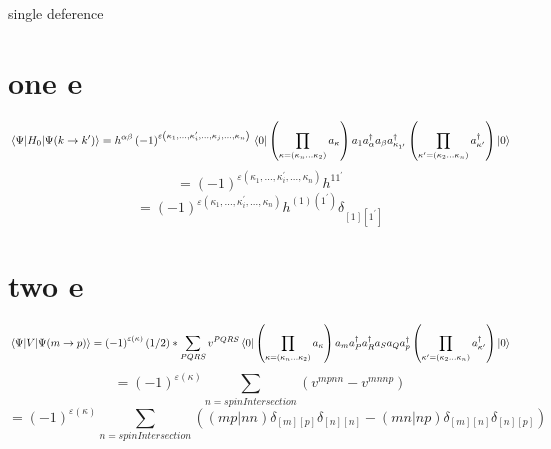 \documentclass{article}
\begin{document}
single deference
\section{one e}
\begin{equation}
    \mel{\Psi }{H_{0}}{\Psi (k\rightarrow k^{\prime})}=h^{\alpha\beta}\left(-1\right)^{\varepsilon\left(\kappa_{1},\dots,\kappa_{i}^{\prime},\dots,\kappa _{j},...,\kappa_{n}\right)}\\
    \bra{0}\left(\prod_{\kappa=\left(\kappa_{n}\dots\kappa_{2}\right)}a_{\kappa}\right)
        a_{1}a^{\dag}_{\alpha  }a_{\beta }a^{\dag}_{\kappa _{1^{\prime}}}
    \left(\prod_{\kappa^{\prime}=\left(\kappa_{2}\dots\kappa_{n}\right)}a^{\dag}_{\kappa^{\prime}}\right)\ket{0}
\end{equation}
\begin{equation}
    =\left(-1\right)^{\varepsilon\left(\kappa_{1},\dots,\kappa_{i}^{\prime},\dots,\kappa_{n}\right)}h^{11^{\prime}}
\end{equation}
\begin{equation}
    =\left(-1\right)^{\varepsilon\left(\kappa_{1},\dots,\kappa_{i}^{\prime},\dots,\kappa_{n}\right)}h^{(1)(1^{\prime})}\delta _{[1][1^{\prime}]}
\end{equation}
\section{two e}
\begin{equation}
    \mel{\Psi }{V}{\Psi (m\rightarrow p)}=\left(-1\right)^{\varepsilon\left(\kappa\right)}(1/2)*\sum_{PQRS} v^{PQRS }\\
    \bra{0}\left(\prod_{\kappa=\left(\kappa_{n}\dots\kappa_{2}\right)}a_{\kappa}\right)
        a_{m}a^{\dag}_{P }a^{\dag}_{R }a_{S }a_{Q }a^{\dag}_{p}
    \left(\prod_{\kappa^{\prime}=\left(\kappa_{2}\dots\kappa_{n}\right)}a^{\dag}_{\kappa^{\prime}}\right)\ket{0}
\end{equation}
\begin{equation}
    =\left(-1\right)^{\varepsilon\left(\kappa\right)}\sum_{n=spinIntersection}\left(v^{mpnn}-v^{mnnp}\right) 
\end{equation}
\begin{equation}
    =\left(-1\right)^{\varepsilon\left(\kappa\right)}\sum_{n=spinIntersection}\left((mp|nn)\delta _{[m][p]}\delta _{[n][n]}-(mn|np)\delta _{[m][n]}\delta _{[n][p]}\right)
\end{equation}
\end{document}
